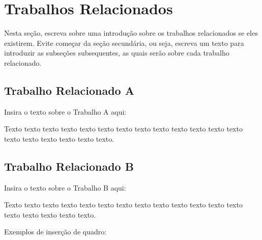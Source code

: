 \chapter{Trabalhos Relacionados}
\label{cap:trabalhos-relacionados}

Nesta seção, escreva sobre uma introdução sobre os trabalhos relacionados se eles existirem. Evite começar da seção secundária, ou seja, escreva um texto para introduzir as subseções subsequentes, as quais serão sobre cada trabalho relacionado.

\section{Trabalho Relacionado A}
\label{sec:trabalho-relacionado-a}

Insira o texto sobre o Trabalho A aqui:

Texto texto texto texto texto texto texto texto texto texto texto texto texto texto texto texto texto texto texto.

\section{Trabalho Relacionado B}
\label{sec:trabalho-relacionado-b}

Insira o texto sobre o Trabalho B aqui:

Texto texto texto texto texto texto texto texto texto texto texto texto texto texto texto texto texto texto.

Exemplos de inserção de quadro:


	\begin{quadro}[h!]	
		\centering
	\end{quadro}


